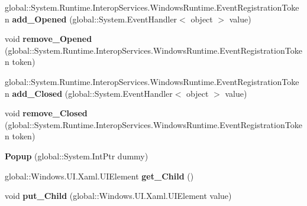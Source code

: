 \begin{DoxyCompactItemize}
global\+::\+System.\+Runtime.\+Interop\+Services.\+Windows\+Runtime.\+Event\+Registration\+Token {\bfseries add\+\_\+\+Opened} (global\+::\+System.\+Event\+Handler$<$ object $>$ value)
\item 
\mbox{\label{class_windows_1_1_u_i_1_1_xaml_1_1_controls_1_1_primitives_1_1_popup_aac5bdd545f4a48100c8fa489c320115d}} 
void {\bfseries remove\+\_\+\+Opened} (global\+::\+System.\+Runtime.\+Interop\+Services.\+Windows\+Runtime.\+Event\+Registration\+Token token)
\item 
\mbox{\label{class_windows_1_1_u_i_1_1_xaml_1_1_controls_1_1_primitives_1_1_popup_aab8f3210f2e0f3757fa03b86108c4603}} 
global\+::\+System.\+Runtime.\+Interop\+Services.\+Windows\+Runtime.\+Event\+Registration\+Token {\bfseries add\+\_\+\+Closed} (global\+::\+System.\+Event\+Handler$<$ object $>$ value)
\item 
\mbox{\label{class_windows_1_1_u_i_1_1_xaml_1_1_controls_1_1_primitives_1_1_popup_a6296c37154aa1e45ab4075199c3672ed}} 
void {\bfseries remove\+\_\+\+Closed} (global\+::\+System.\+Runtime.\+Interop\+Services.\+Windows\+Runtime.\+Event\+Registration\+Token token)
\item 
\mbox{\label{class_windows_1_1_u_i_1_1_xaml_1_1_controls_1_1_primitives_1_1_popup_a4eb29b9974f43030c2c16d2c04ff7121}} 
{\bfseries Popup} (global\+::\+System.\+Int\+Ptr dummy)
\item 
\mbox{\label{class_windows_1_1_u_i_1_1_xaml_1_1_controls_1_1_primitives_1_1_popup_ae0a14f98eaf6c2db22f78c0eb540c36f}} 
global\+::\+Windows.\+U\+I.\+Xaml.\+U\+I\+Element {\bfseries get\+\_\+\+Child} ()
\item 
\mbox{\label{class_windows_1_1_u_i_1_1_xaml_1_1_controls_1_1_primitives_1_1_popup_a59a124fba4b518e1cbd3eb75d64476cf}} 
void {\bfseries put\+\_\+\+Child} (global\+::\+Windows.\+U\+I.\+Xaml.\+U\+I\+Element value)
\item 

\end{DoxyCompactItemize}
